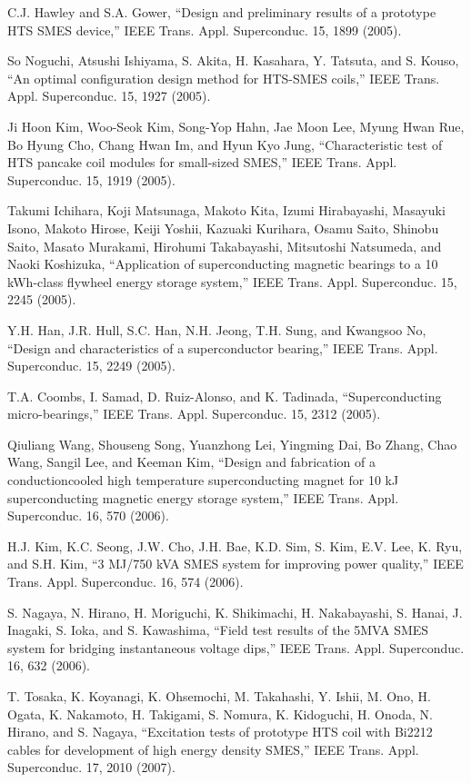 \noindent [9.93] C.J. Hawley and S.A. Gower, ``Design and preliminary results of a prototype HTS
SMES device,” IEEE Trans. Appl. Superconduc. 15, 1899 (2005).

\noindent [9.94] So Noguchi, Atsushi Ishiyama, S. Akita, H. Kasahara, Y. Tatsuta, and S. Kouso,
``An optimal configuration design method for HTS-SMES coils,” IEEE Trans.
Appl. Superconduc. 15, 1927 (2005).

\noindent [9.95] Ji Hoon Kim, Woo-Seok Kim, Song-Yop Hahn, Jae Moon Lee, Myung Hwan Rue,
Bo Hyung Cho, Chang Hwan Im, and Hyun Kyo Jung, ``Characteristic test of HTS
pancake coil modules for small-sized SMES,” IEEE Trans. Appl. Superconduc.
15, 1919 (2005).

\noindent [9.96] Takumi Ichihara, Koji Matsunaga, Makoto Kita, Izumi Hirabayashi, Masayuki
Isono, Makoto Hirose, Keiji Yoshii, Kazuaki Kurihara, Osamu Saito, Shinobu
Saito, Masato Murakami, Hirohumi Takabayashi, Mitsutoshi Natsumeda, and
Naoki Koshizuka, ``Application of superconducting magnetic bearings to a 10
kWh-class flywheel energy storage system,” IEEE Trans. Appl. Superconduc. 15,
2245 (2005).

\noindent [9.97] Y.H. Han, J.R. Hull, S.C. Han, N.H. Jeong, T.H. Sung, and Kwangsoo No, ``Design
and characteristics of a superconductor bearing,” IEEE Trans. Appl. Superconduc.
15, 2249 (2005).

\noindent [9.98] T.A. Coombs, I. Samad, D. Ruiz-Alonso, and K. Tadinada, ``Superconducting
micro-bearings,” IEEE Trans. Appl. Superconduc. 15, 2312 (2005).

\noindent [9.99] Qiuliang Wang, Shouseng Song, Yuanzhong Lei, Yingming Dai, Bo Zhang, Chao
Wang, Sangil Lee, and Keeman Kim, ``Design and fabrication of a conductioncooled
high temperature superconducting magnet for 10 kJ superconducting magnetic
energy storage system,” IEEE Trans. Appl. Superconduc. 16, 570 (2006).

\noindent [9.100] H.J. Kim, K.C. Seong, J.W. Cho, J.H. Bae, K.D. Sim, S. Kim, E.V. Lee, K. Ryu,
and S.H. Kim, ``3 MJ/750 kVA SMES system for improving power quality,” IEEE
Trans. Appl. Superconduc. 16, 574 (2006).

\noindent [9.101] S. Nagaya, N. Hirano, H. Moriguchi, K. Shikimachi, H. Nakabayashi, S. Hanai,
J. Inagaki, S. Ioka, and S. Kawashima, ``Field test results of the 5MVA SMES
system for bridging instantaneous voltage dips,” IEEE Trans. Appl. Superconduc.
16, 632 (2006).

\noindent [9.102] T. Tosaka, K. Koyanagi, K. Ohsemochi, M. Takahashi, Y. Ishii, M. Ono, H. Ogata,
K. Nakamoto, H. Takigami, S. Nomura, K. Kidoguchi, H. Onoda, N. Hirano,
and S. Nagaya, ``Excitation tests of prototype HTS coil with Bi2212 cables for
development of high energy density SMES,” IEEE Trans. Appl. Superconduc.
17, 2010 (2007).

